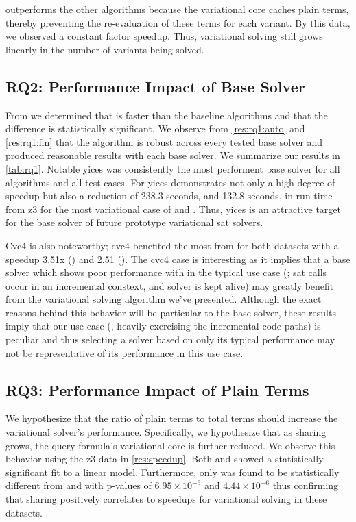 \vsat{} outperforms the other algorithms because the variational core caches
plain terms, thereby preventing the re-evaluation of these terms for each
variant. By this data, we observed a constant factor speedup. Thus, variational
solving still grows linearly in the number of variants being solved.


\subsection{RQ2: Performance Impact of Base Solver}
%
From  we determined that \vTov{} is faster than the baseline algorithms
and that the difference is statistically significant. We observe from
\autoref{res:rq1:auto} and \autoref{res:rq1:fin} that the \vTov{} algorithm is
robust across every tested base solver and \vTov{} produced reasonable results
with each base solver.
%
We summarize our results in \autoref{tab:rq1}. Notable yices was consistently
the most performent base solver for all algorithms and all test cases. For
\vTov{} yices demonstrates not only a high degree of speedup but also a
reduction of 238.3 seconds, and 132.8 seconds, in run time from z3 for the
most variational case of \auto{} and \fin{}. Thus, yices is an attractive
target for the base solver of future prototype variational \ac{sat} solvers.

Cvc4 is also noteworthy; cvc4 benefited the most from \vTov{} for both
datasets with a speedup 3.51x (\auto{}) and 2.51 (\fin{}). The cvc4 case is
interesting as it implies that a base solver which shows poor performance with
in the typical use case (\vTop{}; \ac{sat} calls occur in an incremental
constext, and solver is kept alive) may greatly benefit from the variational
solving algorithm we've presented. Although the exact reasons behind this
behavior will be particular to the base solver, these results imply that our
use case (\ie{}, heavily exercising the incremental code paths) is peculiar
and thus selecting a solver based on only its typical performance may not be
representative of its performance in this use case.

\subsection{RQ3: Performance Impact of Plain Terms}
We hypothesize that the ratio of plain terms to total terms should increase the
variational solver's performance. Specifically, we hypothesize that as sharing
grows, the query formula's variational core is further reduced. We observe this
behavior using the z3 data in \autoref{res:speedup}. Both \vTov{} and \pTop{}
showed a statistically significant fit to a linear model. Furthermore, only
\vTov{} was found to be statistically different from \pTop{} and \pTov{} with
p-values of $6.95\times 10^{-3}$ and $4.44\times 10^{-6}$ thus confirming that
sharing positively correlates to speedups for variational solving in these
datasets.

